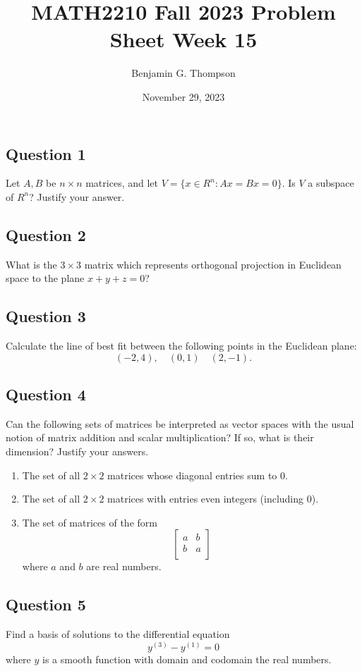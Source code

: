 \documentclass[12pt, a4paper]{article}
\title{MATH2210 Fall 2023 Problem Sheet Week 15}
\author{Benjamin G. Thompson}
\date{November 29, 2023}
\begin{document}
\subsection*{Question 1}
Let $A,B$ be $n \times n$ matrices, and let $V = \{ x \in R^n : Ax = Bx = 0 \}$. Is $V$ a subspace of $R^n$? Justify your answer.

\subsection*{Question 2}
What is the $3 \times 3$ matrix which represents orthogonal projection in Euclidean space to the plane $x + y + z = 0$?

\subsection*{Question 3}
Calculate the line of best fit between the following points in the Euclidean plane:
\[
    (-2, 4), \quad (0,1) \quad (2, -1).
\]

\subsection*{Question 4}
Can the following sets of matrices be interpreted as vector spaces with the usual notion of matrix addition and scalar multiplication? If so, what is their dimension? Justify your answers.

\begin{enumerate}
\item The set of all $2 \times 2$ matrices whose diagonal entries sum to 0.
\item The set of all $2 \times 2$ matrices with entries even integers (including 0).
\item The set of matrices of the form
  \[
  \begin{bmatrix}
    a & b \\
    b & a \\
    \end{bmatrix}
  \]
  where $a$ and $b$ are real numbers.
\end{enumerate}

\subsection*{Question 5}
Find a basis of solutions to the differential equation
\[
y^{(3)} - y^{(1)} = 0
\]
where $y$ is a smooth function with domain and codomain the real numbers.
\end{document}
